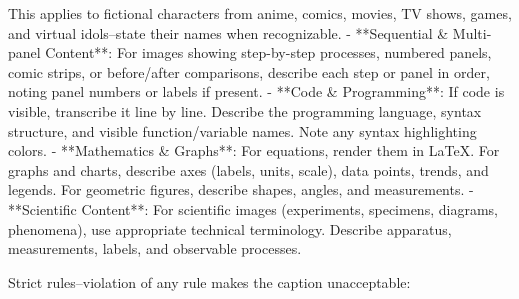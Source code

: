 \begin{tcblisting}
  This applies to fictional characters from anime, comics, movies, TV shows, games, and virtual idols--state their names when recognizable.
- **Sequential & Multi-panel Content**: For images showing step-by-step processes, numbered panels, comic strips, or before/after comparisons, describe each step or panel in order, noting panel numbers or labels if present.
- **Code & Programming**: If code is visible, transcribe it line by line. Describe the programming language, syntax structure, and visible function/variable names. Note any syntax highlighting colors.
- **Mathematics & Graphs**: For equations, render them in LaTeX. For graphs and charts, describe axes (labels, units, scale), data points, trends, and legends. For geometric figures, describe shapes, angles, and measurements.
- **Scientific Content**: For scientific images (experiments, specimens, diagrams, phenomena), use appropriate technical terminology. Describe apparatus, measurements, labels, and observable processes.

Strict rules--violation of any rule makes the caption unacceptable:


\end{tcblisting}

